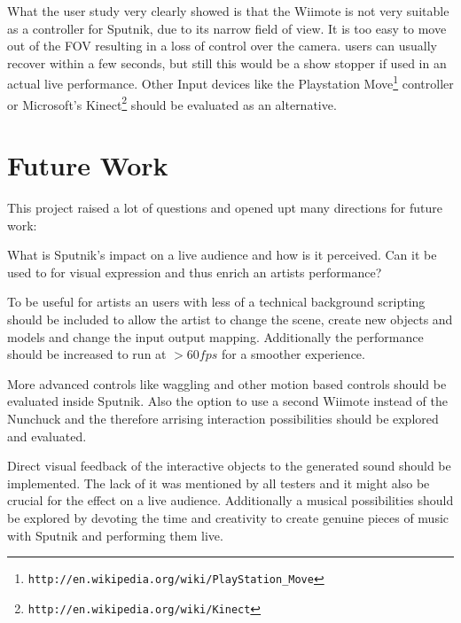 \documentclass[10pt,a4paper]{scrartcl}
\begin{document}
What the user study very clearly showed is that the Wiimote is not very suitable as a controller for Sputnik, due to its narrow field of view. It is too easy to move out of the FOV resulting in a loss of control over the camera. users can usually recover within a few seconds, but still this would be a show stopper if used in an actual live performance. Other Input devices like the Playstation Move\footnote{\texttt{http://en.wikipedia.org/wiki/PlayStation\_Move}} controller or Microsoft's Kinect\footnote{\texttt{http://en.wikipedia.org/wiki/Kinect}} should be evaluated as an alternative.


\section{Future Work}

This project raised a lot of questions and opened upt many directions for future work:

What is Sputnik's impact on a live audience and how is it perceived. Can it be used to for visual expression and thus enrich an artists performance?

To be useful for artists an users with less of a technical background scripting should be included to allow the artist to change the scene, create new objects and models and change the input output mapping. Additionally the performance should be increased to run at $> 60fps$ for a smoother experience.

More advanced controls like waggling and other motion based controls should be evaluated inside Sputnik. Also the option to use a second Wiimote instead of the Nunchuck and the therefore arrising interaction possibilities should be explored and evaluated.

Direct visual feedback of the interactive objects to the generated sound should be implemented. The lack of it was mentioned by all testers and it might also be crucial for the effect on a live audience. Additionally a musical possibilities should be explored by devoting the time and creativity to create genuine pieces of music with Sputnik and performing them live.
\end{document}
